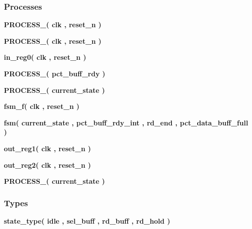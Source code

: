 \subsubsection*{Processes}
 \begin{DoxyCompactItemize}
\item 
{\bf P\+R\+O\+C\+E\+S\+S\+\_}{\bfseries  ( {\bfseries {\bfseries {\bf clk}} \textcolor{vhdlchar}{ }} , {\bfseries {\bfseries {\bf reset\+\_\+n}} \textcolor{vhdlchar}{ }} )}
\item 
{\bf P\+R\+O\+C\+E\+S\+S\+\_}{\bfseries  ( {\bfseries {\bfseries {\bf clk}} \textcolor{vhdlchar}{ }} , {\bfseries {\bfseries {\bf reset\+\_\+n}} \textcolor{vhdlchar}{ }} )}
\item 
{\bf in\+\_\+reg0}{\bfseries  ( {\bfseries {\bfseries {\bf clk}} \textcolor{vhdlchar}{ }} , {\bfseries {\bfseries {\bf reset\+\_\+n}} \textcolor{vhdlchar}{ }} )}
\item 
{\bf P\+R\+O\+C\+E\+S\+S\+\_}{\bfseries  ( {\bfseries {\bfseries {\bf pct\+\_\+buff\+\_\+rdy}} \textcolor{vhdlchar}{ }} )}
\item 
{\bf P\+R\+O\+C\+E\+S\+S\+\_}{\bfseries  ( {\bfseries {\bfseries {\bf current\+\_\+state}} \textcolor{vhdlchar}{ }} )}
\item 
{\bf fsm\+\_\+f}{\bfseries  ( {\bfseries {\bfseries {\bf clk}} \textcolor{vhdlchar}{ }} , {\bfseries {\bfseries {\bf reset\+\_\+n}} \textcolor{vhdlchar}{ }} )}
\item 
{\bf fsm}{\bfseries  ( {\bfseries {\bfseries {\bf current\+\_\+state}} \textcolor{vhdlchar}{ }} , {\bfseries {\bfseries {\bf pct\+\_\+buff\+\_\+rdy\+\_\+int}} \textcolor{vhdlchar}{ }} , {\bfseries {\bfseries {\bf rd\+\_\+end}} \textcolor{vhdlchar}{ }} , {\bfseries {\bfseries {\bf pct\+\_\+data\+\_\+buff\+\_\+full}} \textcolor{vhdlchar}{ }} )}
\item 
{\bf out\+\_\+reg1}{\bfseries  ( {\bfseries {\bfseries {\bf clk}} \textcolor{vhdlchar}{ }} , {\bfseries {\bfseries {\bf reset\+\_\+n}} \textcolor{vhdlchar}{ }} )}
\item 
{\bf out\+\_\+reg2}{\bfseries  ( {\bfseries {\bfseries {\bf clk}} \textcolor{vhdlchar}{ }} , {\bfseries {\bfseries {\bf reset\+\_\+n}} \textcolor{vhdlchar}{ }} )}
\item 
{\bf P\+R\+O\+C\+E\+S\+S\+\_}{\bfseries  ( {\bfseries {\bfseries {\bf current\+\_\+state}} \textcolor{vhdlchar}{ }} )}
\end{DoxyCompactItemize}
\subsubsection*{Types}
 \begin{DoxyCompactItemize}
\item 
{\bfseries {\bf state\+\_\+type}{\bfseries \textcolor{vhdlchar}{(}\textcolor{vhdlchar}{ }\textcolor{vhdlchar}{idle}\textcolor{vhdlchar}{ }\textcolor{vhdlchar}{,}\textcolor{vhdlchar}{ }\textcolor{vhdlchar}{sel\+\_\+buff}\textcolor{vhdlchar}{ }\textcolor{vhdlchar}{,}\textcolor{vhdlchar}{ }\textcolor{vhdlchar}{rd\+\_\+buff}\textcolor{vhdlchar}{ }\textcolor{vhdlchar}{,}\textcolor{vhdlchar}{ }\textcolor{vhdlchar}{rd\+\_\+hold}\textcolor{vhdlchar}{ }\textcolor{vhdlchar}{)}\textcolor{vhdlchar}{ }}} 
\end{DoxyCompactItemize}
